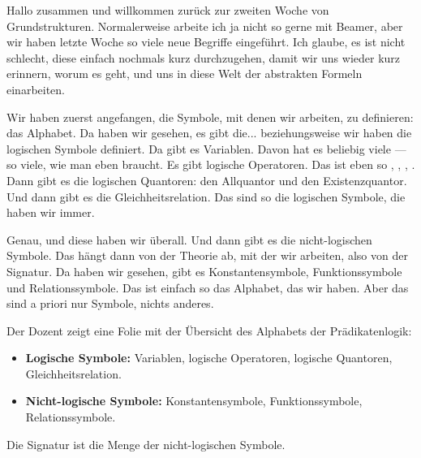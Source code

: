 \begin{spoken-clean}[00:00:00 - 00:01:27]
Hallo zusammen und willkommen zurück zur zweiten Woche von Grundstrukturen. Normalerweise arbeite ich ja nicht so gerne mit Beamer, aber wir haben letzte Woche so viele neue Begriffe eingeführt. Ich glaube, es ist nicht schlecht, diese einfach nochmals kurz durchzugehen, damit wir uns wieder kurz erinnern, worum es geht, und uns in diese Welt der abstrakten Formeln einarbeiten.

Wir haben zuerst angefangen, die Symbole, mit denen wir arbeiten, zu definieren: das Alphabet. Da haben wir gesehen, es gibt die... beziehungsweise wir haben die logischen Symbole definiert. Da gibt es Variablen. Davon hat es beliebig viele --- so viele, wie man eben braucht. Es gibt logische Operatoren. Das ist eben so , , , . Dann gibt es die logischen Quantoren: den Allquantor und den Existenzquantor. Und dann gibt es die Gleichheitsrelation. Das sind so die logischen Symbole, die haben wir immer.

Genau, und diese haben wir überall. Und dann gibt es die nicht-logischen Symbole. Das hängt dann von der Theorie ab, mit der wir arbeiten, also von der Signatur. Da haben wir gesehen, gibt es Konstantensymbole, Funktionssymbole und Relationssymbole. Das ist einfach so das Alphabet, das wir haben. Aber das sind a priori nur Symbole, nichts anderes.
\end{spoken-clean}

\begin{meta-note}
Der Dozent zeigt eine Folie mit der Übersicht des Alphabets der Prädikatenlogik:
\begin{itemize}
    \item \textbf{Logische Symbole:} Variablen, logische Operatoren, logische Quantoren, Gleichheitsrelation.
    \item \textbf{Nicht-logische Symbole:} Konstantensymbole, Funktionssymbole, Relationssymbole.
\end{itemize}
Die Signatur ist die Menge der nicht-logischen Symbole.
\end{meta-note}

